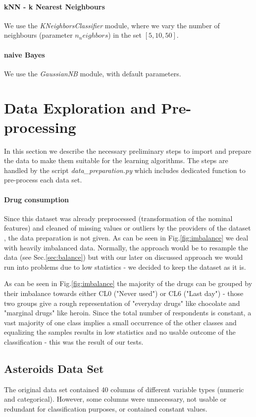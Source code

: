 \documentclass{article}
\begin{document}
\paragraph{kNN - k Nearest Neighbours} We use the \textit{KNeighborsClassifier} module, where we vary the number of neighbours (parameter $n_neighbors$) in the set $[5,10,50]$.

\paragraph{naive Bayes}  We use the \textit{GaussianNB} module, with default parameters.



\section{Data Exploration and Pre-processing}
In this section we describe the necessary preliminary steps to import and prepare the data to make them suitable for the learning algorithms. The steps are handled by the script \textit{data\_preparation.py} which includes dedicated function to pre-process each data set.

\paragraph{Drug consumption}
Since this dataset was already preprocessed (transformation of the nominal features) and cleaned of missing values or outliers by the providers of the dataset \cite{fehrman2017factor}, the data preparation is not given. As can be seen in Fig.\ref{fig:imbalance} we deal with heavily imbalanced data. Normally, the approach would be to resample the data (see Sec.\ref{sec:balance}) but with our later on discussed approach we would run into problems due to low statistics - we decided to keep the dataset as it is.

As can be seen in Fig.\ref{fig:imbalance} the majority of the drugs can be grouped by their imbalance towards either CL0 ("Never used") or CL6 ("Last day") - those two groups give a rough representation of "everyday drugs" like chocolate and "marginal drugs" like heroin. Since the total number of respondents is constant, a vast majority of one class implies a small occurrence of the other classes and equalizing the samples results in low statistics and no usable outcome of the classification - this was the result of our tests. \\

\subsection{Asteroids Data Set}
The original data set contained 40 columns of different variable types (numeric and categorical). However, some columns were unnecessary, not usable or redundant for classification purposes, or contained constant values.
\end{document}
